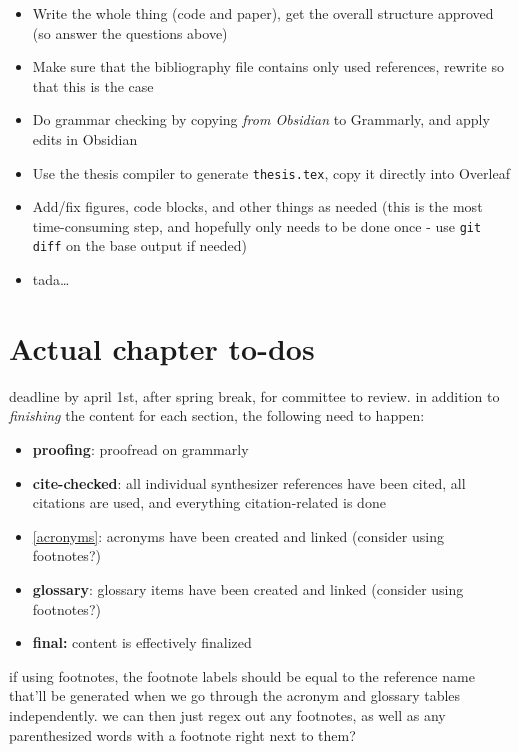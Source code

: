 \begin{itemize}
\tightlist
\item
  Write the whole thing (code and paper), get the overall structure
  approved (so answer the questions above)
\item
  Make sure that the bibliography file contains only used references,
  rewrite so that this is the case
\item
  Do grammar checking by copying \emph{from Obsidian} to Grammarly, and
  apply edits in Obsidian
\item
  Use the thesis compiler to generate
  \passthrough{\lstinline!thesis.tex!}, copy it directly into Overleaf
\item
  Add/fix figures, code blocks, and other things as needed (this is the
  most time-consuming step, and hopefully only needs to be done once -
  use \passthrough{\lstinline!git diff!} on the base output if needed)
\item
  tada\ldots{}
\end{itemize}

\section{Actual chapter to-dos}\label{actual-chapter-to-dos}

deadline by april 1st, after spring break, for committee to review. in
addition to \emph{finishing} the content for each section, the following
need to happen:

\begin{itemize}
\tightlist
\item
  \textbf{proofing}: proofread on grammarly
\item
  \textbf{cite-checked}: all individual synthesizer references have been
  cited, all citations are used, and everything citation-related is done
\item
  \autoref{acronyms}: acronyms have been created and linked (consider
  using footnotes?)
\item
  \textbf{glossary}: glossary items have been created and linked
  (consider using footnotes?)
\item
  \textbf{final:} content is effectively finalized
\end{itemize}

if using footnotes, the footnote labels should be equal to the reference
name that'll be generated when we go through the acronym and glossary
tables independently. we can then just regex out any footnotes, as well
as any parenthesized words with a footnote right next to them?

